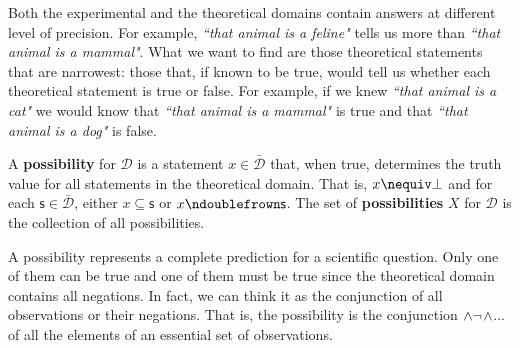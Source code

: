 \documentclass[11pt,letterpaper,fleqn]{memoir} %
\begin{document}
Both the experimental and the theoretical domains contain answers at different level of precision. For example, \emph{``that animal is a feline"} tells us more than \emph{``that animal is a mammal"}. What we want to find are those theoretical statements that are narrowest: those that, if known to be true, would tell us whether each theoretical statement is true or false. For example, if we knew \emph{``that animal is a cat"} we would know that \emph{``that animal is a mammal"} is true and that \emph{``that animal is a dog"} is false.

\begin{mathSection}

\begin{defn}
	A \textbf{possibility} for $\mathcal{D}$ is a statement $x \in \bar{\mathcal{D}}$ that, when true, determines the truth value for all statements in the theoretical domain. That is, $x \nequiv \contradiction$ and for each $\mathsf{s} \in \bar{\mathcal{D}}$, either $x \subseteq \mathsf{s}$ or $x \ncomp \mathsf{s}$. The set of \textbf{possibilities} $X$ for $\mathcal{D}$ is the collection of all possibilities.
\end{defn}

\end{mathSection}

A possibility represents a complete prediction for a scientific question. Only one of them can be true and one of them must be true since the theoretical domain contains all negations. In fact, we can think it as the conjunction of all observations or their negations. That is, the possibility  is the conjunction $\wedge \neg$$\wedge$... of all the elements of an essential set of observations.
\end{document}
